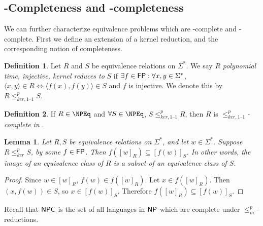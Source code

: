 \documentclass{article}
\newtheorem{lemma}[lemma]{Lemma}
\theoremstyle{definition} \newtheorem{definition}[definition]{Definition}
\newcommand{\sigmastar}{\Sigma^{*}} %
\newcommand{\kr}{\leq^{p}_{ker}} %
\newcommand{\kri}{\leq^{p}_{ker,1\text{--}1}} %
\newcommand{\mor}{\leq^{p}_{m}} %
\newcommand{\defn}[1]{\emph{#1}} %
\newcommand{\pair}[2]{\langle#1,#2\rangle} %
\begin{document}

\subsection{\texorpdfstring{\NP}{NP}-Completeness and
  \texorpdfstring{\NPEq}{NPEq}-completeness}

We can further characterize equivalence problems which are \NP-complete and
\NPEq-complete. First we define an extension of a kernel reduction, and the
corresponding notion of completeness.

\begin{definition}
  Let $R$ and $S$ be equivalence relations on $\sigmastar$. We say $R$
  \defn{polynomial time, injective, kernel reduces to} $S$ if $\exists
  f\in\FP:\forall x,y\in\sigmastar$, $\pair{x}{y}\in R \iff
  \pair{f(x)}{f(y)}\in S$ and $f$ is injective. We denote this by $R\kri S$.
\end{definition}

\begin{definition}
  If $R\in\NPEq$ and $\forall S\in\NPEq$, $S\kri R$, then $R$ is
  \defn{$\kri$-complete in \NPEq}.
\end{definition}

\begin{lemma}\label{lem:image}
  Let $R,S$ be equivalence relations on $\sigmastar$, and let
  $w\in\sigmastar$. Suppose $R\kr S$, by some $f\in{\ensuremath{\mathsf{FP}}}$. Then
  $f([w]_R)\subseteq [f(w)]_S$. In other words, the image of an equivalence
  class of $R$ is a subset of an equivalence class of $S$.
\end{lemma}
\begin{proof}
  Since $w\in [w]_R$, $f(w)\in f([w]_R)$. Let $x\in f([w]_R)$. Then $(x,
  f(w))\in S$, so $x\in [f(w)]_S$. Therefore $f([w]_R)\subseteq [f(w)]_S$.
\end{proof}


Recall that ${\mathsf{NPC}}$ is the set of all languages in ${\mathsf{NP}}$ which
are complete under $\mor$-reductions.
\end{document}
